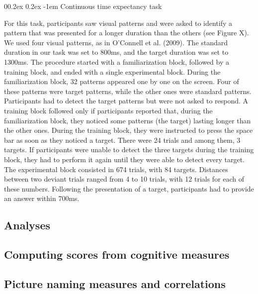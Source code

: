\documentclass[
  man,floatsintext]{apa6}
\makeatletter
\let\oldparagraph\paragraph
\renewcommand{\paragraph}[1]{\oldparagraph{#1}\mbox{}}
\renewcommand{\paragraph}{\@startsection{paragraph}{4}{\parindent}%
  {0\baselineskip \@plus 0.2ex \@minus 0.2ex}%
  {-1em}%
  {\normalfont\normalsize\bfseries\itshape\typesectitle}}
\makeatother
\begin{document}
\hypertarget{continuous-time-expectancy-task}{%
\paragraph{Continuous time expectancy task}\label{continuous-time-expectancy-task}}

For this task, participants saw visual patterns and were asked to identify a pattern that was presented for a longer duration than the others (see Figure X). We used four visual patterns, as in O'Connell et al. (2009). The standard duration in our task was set to 800ms, and the target duration was set to 1300ms. The procedure started with a familiarization block, followed by a training block, and ended with a single experimental block. During the familiarization block, 32 patterns appeared one by one on the screen. Four of these patterns were target patterns, while the other ones were standard patterns. Participants had to detect the target patterns but were not asked to respond. A training block followed only if participants reported that, during the familiarization block, they noticed some patterns (the target) lasting longer than the other ones. During the training block, they were instructed to press the space bar as soon as they noticed a target. There were 24 trials and among them, 3 targets. If participants were unable to detect the three targets during the training block, they had to perform it again until they were able to detect every target. The experimental block consisted in 674 trials, with 84 targets. Distances between two deviant trials ranged from 4 to 10 trials, with 12 trials for each of these numbers. Following the presentation of a target, participants had to provide an answer within 700ms.

\hypertarget{analyses}{%
\subsection{Analyses}\label{analyses}}

\hypertarget{computing-scores-from-cognitive-measures}{%
\subsection{Computing scores from cognitive measures}\label{computing-scores-from-cognitive-measures}}

\hypertarget{picture-naming-measures-and-correlations}{%
\subsection{Picture naming measures and correlations}\label{picture-naming-measures-and-correlations}}
\end{document}
